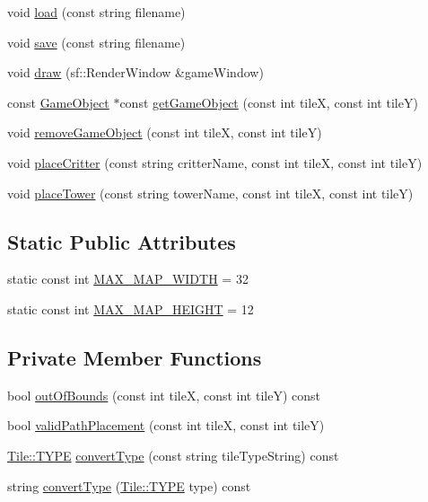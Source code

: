 \begin{DoxyCompactItemize}
\item 
void \hyperlink{class_map_a2b6b1ca722620f097ea044f1c41e411e}{load} (const string filename)
\item 
void \hyperlink{class_map_a7c8e0a56747581e1b9f5248ceb043275}{save} (const string filename)
\item 
void \hyperlink{class_map_a84c0e37119c02d7c81071271e004041d}{draw} (sf\+::\+Render\+Window \&game\+Window)
\item 
const \hyperlink{class_game_object}{Game\+Object} $\ast$const \hyperlink{class_map_ac6851c4a19daaafd76eb5bcd9be23f1b}{get\+Game\+Object} (const int tile\+X, const int tile\+Y)
\item 
void \hyperlink{class_map_ab12fa393f25fbbd4ad2fa183a033162b}{remove\+Game\+Object} (const int tile\+X, const int tile\+Y)
\item 
void \hyperlink{class_map_afba6396c482b9af9671bc33d7ffdb8dd}{place\+Critter} (const string critter\+Name, const int tile\+X, const int tile\+Y)
\item 
void \hyperlink{class_map_a7f1f7f192ff9f48806d5d192fb38d3aa}{place\+Tower} (const string tower\+Name, const int tile\+X, const int tile\+Y)
\end{DoxyCompactItemize}
\subsection*{Static Public Attributes}
\begin{DoxyCompactItemize}
\item 
static const int \hyperlink{class_map_ae9582bc1e99bdf1ecc5413f81cc95f69}{M\+A\+X\+\_\+\+M\+A\+P\+\_\+\+W\+I\+D\+T\+H} = 32
\item 
static const int \hyperlink{class_map_aef313313ef5bbeafeae1f6b66073bace}{M\+A\+X\+\_\+\+M\+A\+P\+\_\+\+H\+E\+I\+G\+H\+T} = 12
\end{DoxyCompactItemize}
\subsection*{Private Member Functions}
\begin{DoxyCompactItemize}
\item 
bool \hyperlink{class_map_a6995c0de6fe380ffa652990490b867c8}{out\+Of\+Bounds} (const int tile\+X, const int tile\+Y) const 
\item 
bool \hyperlink{class_map_a63a6d8a5e6bcbc1cc92cd29fcff638db}{valid\+Path\+Placement} (const int tile\+X, const int tile\+Y)
\item 
\hyperlink{class_tile_acb53d82f9dacff45a98acc63276928eb}{Tile\+::\+T\+Y\+P\+E} \hyperlink{class_map_aae1f3e3de0581ba792b58290c164920f}{convert\+Type} (const string tile\+Type\+String) const 
\item 
string \hyperlink{class_map_a21333928f184469ef09d42112cd8f0a1}{convert\+Type} (\hyperlink{class_tile_acb53d82f9dacff45a98acc63276928eb}{Tile\+::\+T\+Y\+P\+E} type) const 
\end{DoxyCompactItemize}

